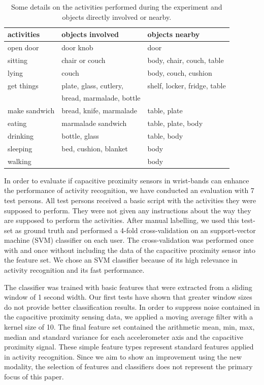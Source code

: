 \documentclass[runningheads,a4paper]{llncs}
\begin{document}
\begin{table}
	\centering
	\caption{Some details on the activities performed during the experiment and objects directly involved or nearby.}
	\setlength{\tabcolsep}{12pt}
	\begin{tabular}{lll}
		\toprule
		activities		& objects involved			& objects nearby			\\ 
		\midrule
		open door		& door knob 				& door  					\\
		sitting			& chair or couch			& body, chair, couch, table	\\
		lying			& couch						& body, couch, cushion		\\
		get things		& plate, glass, cutlery, 	& shelf, locker, fridge, table \\ 
						& bread, marmalade, bottle  & 							\\
		make sandwich	& bread, knife, marmalade	& table, plate 				\\
		eating			& marmalade sandwich		& table, plate, body		\\
		drinking 		& bottle, glass 			& table, body				\\
		sleeping		& bed, cushion, blanket		& body 						\\
		walking			& 							& body						\\
		 \bottomrule
	\end{tabular}
	\label{tab:activities}
\end{table}

In order to evaluate if capacitive proximity sensors in wrist-bands can enhance the performance of activity recognition, we have conducted an evaluation with 7 test persons. All test persons received a basic script with the activities they were supposed to perform. They were not given any instructions about the way they are supposed to perform the activities. After manual labelling, we used this test-set as ground truth and performed a 4-fold cross-validation on an support-vector machine (SVM) classifier on each user. The cross-validation was performed once with and once without including the data of the capacitive proximity sensor into the feature set. We chose an SVM classifier because of its high relevance in activity recognition and its fast performance. 

The classifier was trained with basic features that were extracted from a sliding window of 1 second width. Our first tests have shown that greater window sizes do not provide better classification results. In order to suppress noise contained in the capacitive proximity sensing data, we applied a moving average filter with a kernel size of 10. The final feature set contained the arithmetic mean, min, max, median and standard variance for each accelerometer axis and the capacitive proximity signal. These simple feature types represent standard features applied in activity recognition. Since we aim to show an improvement using the new modality, the selection of features and classifiers does not represent the primary focus of this paper. 
\end{document}
